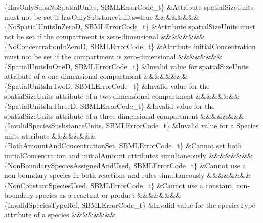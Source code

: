 \begin{DoxyParagraph}{}
\begin{longtabu}
\{Has\+Only\+Subs\+No\+Spatial\+Units, S\+B\+M\+L\+Error\+Code\+\_\+t\} &Attribute \textquotesingle{}spatial\+Size\+Units\textquotesingle{} must not be set if \textquotesingle{}has\+Only\+Substance\+Units\textquotesingle{}=\textquotesingle{}true\textquotesingle{} &&&&&&&&\\
\{No\+Spatial\+Units\+In\+ZeroD, S\+B\+M\+L\+Error\+Code\+\_\+t\} &Attribute \textquotesingle{}spatial\+Size\+Units\textquotesingle{} must not be set if the compartment is zero-\/dimensional &&&&&&&&\\
\{No\+Concentration\+In\+ZeroD, S\+B\+M\+L\+Error\+Code\+\_\+t\} &Attribute \textquotesingle{}initial\+Concentration\textquotesingle{} must not be set if the compartment is zero-\/dimensional &&&&&&&&\\
\{Spatial\+Units\+In\+OneD, S\+B\+M\+L\+Error\+Code\+\_\+t\} &Invalid value for \textquotesingle{}spatial\+Size\+Units\textquotesingle{} attribute of a one-\/dimensional compartment &&&&&&&&\\
\{Spatial\+Units\+In\+TwoD, S\+B\+M\+L\+Error\+Code\+\_\+t\} &Invalid value for the \textquotesingle{}spatial\+Size\+Units\textquotesingle{} attribute of a two-\/dimensional compartment &&&&&&&&\\
\{Spatial\+Units\+In\+ThreeD, S\+B\+M\+L\+Error\+Code\+\_\+t\} &Invalid value for the \textquotesingle{}spatial\+Size\+Units\textquotesingle{} attribute of a three-\/dimensional compartment &&&&&&&&\\
\{Invalid\+Species\+Susbstance\+Units, S\+B\+M\+L\+Error\+Code\+\_\+t\} &Invalid value for a \hyperlink{class_species}{Species} \textquotesingle{}units\textquotesingle{} attribute &&&&&&&&\\
\{Both\+Amount\+And\+Concentration\+Set, S\+B\+M\+L\+Error\+Code\+\_\+t\} &Cannot set both \textquotesingle{}initial\+Concentration\textquotesingle{} and \textquotesingle{}initial\+Amount\textquotesingle{} attributes simultaneously &&&&&&&&\\
\{Non\+Boundary\+Species\+Assigned\+And\+Used, S\+B\+M\+L\+Error\+Code\+\_\+t\} &Cannot use a non-\/boundary species in both reactions and rules simultaneously &&&&&&&&\\
\{Non\+Constant\+Species\+Used, S\+B\+M\+L\+Error\+Code\+\_\+t\} &Cannot use a constant, non-\/boundary species as a reactant or product &&&&&&&&\\
\{Invalid\+Species\+Type\+Ref, S\+B\+M\+L\+Error\+Code\+\_\+t\} &Invalid value for the \textquotesingle{}species\+Type\textquotesingle{} attribute of a species &&&&&&&&\\

\end{longtabu}
\end{DoxyParagraph}
